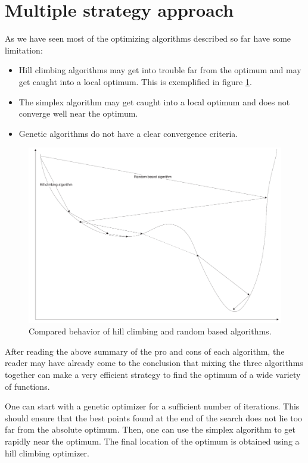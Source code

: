 \documentclass[twoside]{book}
\begin{document}
\section{Multiple strategy approach}
\label{sec:multistrategy} As we have seen most of the optimizing
algorithms described so far have some limitation:
\begin{itemize}
  \item Hill climbing algorithms may get into trouble far from the
  optimum and may get caught into a local optimum. This is exemplified in figure \ref{fig:hillvsrandom}.
  \item The simplex algorithm may get caught into a local optimum
  and does not converge well near the optimum.
  \item Genetic algorithms do not have a clear convergence
  criteria.
\end{itemize}
\begin{figure}
\centering\includegraphics[width=12cm]{Figures/OptimizingComparisonvsd}
\caption{Compared behavior of hill climbing and random based algorithms.}\label{fig:hillvsrandom}
\end{figure}
After reading the above summary of the pro and cons of each
algorithm, the reader may have already come to the conclusion that
mixing the three algorithms together can make a very efficient
strategy to find the optimum of a wide variety of functions.

One can start with a genetic optimizer for a sufficient number of
iterations. This should ensure that the best points found at the
end of the search does not lie too far from the absolute optimum.
Then, one can use the simplex algorithm to get rapidly near the
optimum. The final location of the optimum is obtained using a
hill climbing optimizer.
\end{document}
